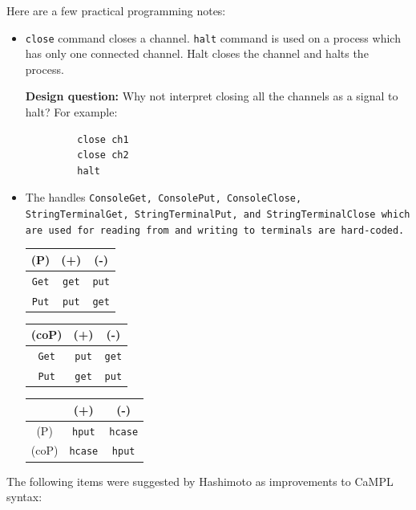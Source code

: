 \documentclass[acmsmall]{acmart}
\begin{document}
Here are a few practical programming notes:
\begin{itemize}
	\item {\tt close} command closes a channel. {\tt halt} command is used on a process which has only one connected channel. Halt closes the channel and halts the process. 
	
	{\bf Design question:} Why not interpret closing all the channels as a signal to halt? For example: 
	\begin{verbatim}
		 close ch1  
		 close ch2  
		 halt
	\end{verbatim}
	
	\item The handles \tt{ConsoleGet}, \tt{ConsolePut}, \tt{ConsoleClose}, \tt{StringTerminalGet}, \tt{StringTerminalPut}, and \tt{StringTerminalClose} which are used for reading from and writing to terminals are hard-coded.  
	
\begin{center}
	\begin{tabular}{ c | c | c }
		     (P)       & (+) & (-) \\
		 \hline      
		 {\tt Get}  & {\tt get}  & {\tt put} \\
		 \hline
		 {\tt Put}  & {\tt put}  & {\tt get} 
	\end{tabular}
	\quad \quad 
	\begin{tabular}{ c | c | c }
		     (coP)       & (+) & (-) \\
		 \hline      
		 {\tt Get}  & {\tt put}  & {\tt get} \\
		 \hline
		 {\tt Put}  & {\tt get}  & {\tt put} 
	\end{tabular}
	\quad \quad 
	\begin{tabular}{ c | c | c }
		            & (+) & (-) \\
		 \hline      
		 (P)  & {\tt hput}  & {\tt hcase} \\
		 \hline
		 (coP)  & {\tt hcase}  & {\tt hput} 
	\end{tabular}
\end{center}
 
\end{itemize}

The following items were suggested by Hashimoto as improvements to CaMPL syntax:
\end{document}
